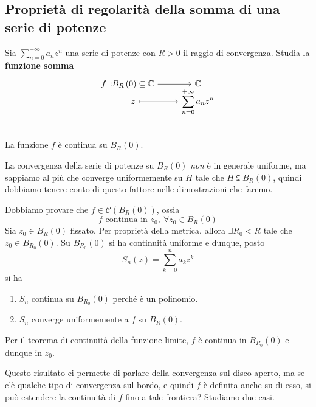 \subsection{Proprietà di regolarità della somma di una serie di potenze}
Sia $\displaystyle\sum_{n=0}^{+\infty}a_nz^n$ una serie di potenze con $R>0$ il raggio di convergenza. Studia la \textbf{funzione somma}
\begin{equation}
	\funztot{f}{B_R\left(0\right)\subseteq\complexset}{\complexset}{z}{\displaystyle\sum_{n=0}^{+\infty}a_nz^n}
\end{equation}
\begin{proposition}~{}\\
	La funzione $f$ è continua su $B_R\left(0\right)$.
\end{proposition}
\begin{attention}
	La convergenza della serie di potenze su $B_R\left(0\right)$ \textit{non} è in generale uniforme, ma sappiamo al più che converge uniformemente su $H$ tale che $\overline{H}\subsetneqq B_R\left(0\right)$, quindi dobbiamo tenere conto di questo fattore nelle dimostrazioni che faremo.
\end{attention}
\begin{demonstration}
	Dobbiamo provare che $f\in\mathcal{C}\left(B_R\left(0\right)\right)$, ossia
	\begin{equation*}
		f\text{ continua in }z_0,\ \forall z_0\in B_R\left(0\right)
	\end{equation*}
	Sia $z_0\in B_R\left(0\right)$ fissato. Per proprietà della metrica, allora $\exists R_0 < R$ tale che $z_0\in B_{R_0}\left(0\right)$. Su $B_{R_0}\left(0\right)$ si ha continuità uniforme e dunque, posto
	\begin{equation*}
		S_n\left(z\right)=\sum_{k=0}^{n}a_kz^k
	\end{equation*}
si ha
\begin{enumerate}
	\item $S_n$ continua su $B_{R_0}\left(0\right)$ perché è un polinomio.
	\item $S_n$ converge uniformemente a $f$ su $B_R\left(0\right)$.
\end{enumerate}
Per il teorema di continuità della funzione limite, $f$ è continua in $B_{R_0}\left(0\right)$ e dunque in $z_0$. 
\end{demonstration}
Questo risultato ci permette di parlare della convergenza sul disco aperto, ma se c'è qualche tipo di convergenza sul bordo, e quindi $f$ è definita anche su di esso, si può estendere la continuità di $f$ fino a tale frontiera? Studiamo due casi.
